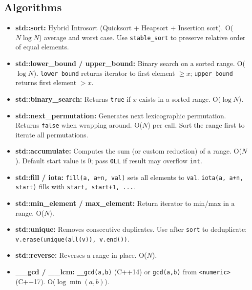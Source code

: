 \subsection{Algorithms}

\begin{itemize}
    \item \textbf{std::sort: } Hybrid Introsort (Quicksort + Heapsort + Insertion sort). O($N \log N$) average and worst case. Use \texttt{stable\_sort} to preserve relative order of equal elements.
    \item \textbf{std::lower\_bound / upper\_bound: } Binary search on a sorted range. O($\log N$). \texttt{lower\_bound} returns iterator to first element $\geq x$; \texttt{upper\_bound} returns first element $> x$.
    \item \textbf{std::binary\_search: } Returns \texttt{true} if $x$ exists in a sorted range. O($\log N$).
    \item \textbf{std::next\_permutation: } Generates next lexicographic permutation. Returns \texttt{false} when wrapping around. O($N$) per call. Sort the range first to iterate all permutations.
    \item \textbf{std::accumulate: } Computes the sum (or custom reduction) of a range. O($N$). Default start value is 0; pass \texttt{0LL} if result may overflow \texttt{int}.
    \item \textbf{std::fill / iota: } \texttt{fill(a, a+n, val)} sets all elements to \texttt{val}. \texttt{iota(a, a+n, start)} fills with \texttt{start, start+1, ...}.
    \item \textbf{std::min\_element / max\_element: } Return iterator to min/max in a range. O($N$).
    \item \textbf{std::unique: } Removes consecutive duplicates. Use after \texttt{sort} to deduplicate: \texttt{v.erase(unique(all(v)), v.end())}.
    \item \textbf{std::reverse: } Reverses a range in-place. O($N$).
    \item \textbf{\_\_gcd / \_\_lcm: } \texttt{\_\_gcd(a,b)} (C++14) or \texttt{gcd(a,b)} from \texttt{<numeric>} (C++17). O($\log \min(a,b)$).
\end{itemize}
